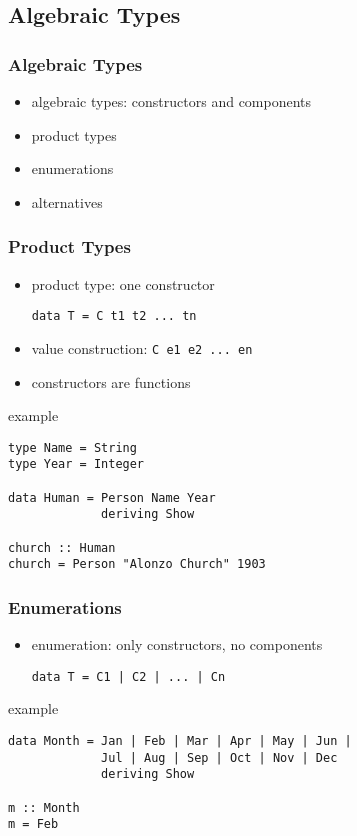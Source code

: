 \documentclass[dvipsnames]{beamer}
\theoremstyle{plain}
\begin{document}
\subsection{Algebraic Types}

\begin{frame}[fragile]
  \frametitle{Algebraic Types}

  \begin{itemize}
    \item algebraic types: constructors and components

    \medskip
    \item product types
    \item enumerations
    \item alternatives
  \end{itemize}
\end{frame}

\begin{frame}[fragile]
  \frametitle{Product Types}

  \begin{itemize}
    \item product type: one constructor
    \smallskip
    \begin{lstlisting}
data T = C t1 t2 ... tn
    \end{lstlisting}
    \item value construction: \lstinline{C e1 e2 ... en}
    \item constructors are functions
  \end{itemize}

  \begin{exampleblock}{example}
    \begin{lstlisting}
type Name = String
type Year = Integer

data Human = Person Name Year
             deriving Show

church :: Human
church = Person "Alonzo Church" 1903
    \end{lstlisting}
  \end{exampleblock}
\end{frame}

\begin{frame}[fragile]
  \frametitle{Enumerations}

  \begin{itemize}
    \item enumeration: only constructors, no components
    \smallskip
    \begin{lstlisting}
data T = C1 | C2 | ... | Cn
    \end{lstlisting}
  \end{itemize}

  \begin{exampleblock}{example}
    \begin{lstlisting}
data Month = Jan | Feb | Mar | Apr | May | Jun |
             Jul | Aug | Sep | Oct | Nov | Dec
             deriving Show

m :: Month
m = Feb
    \end{lstlisting}
  \end{exampleblock}
\end{frame}
\end{document}
